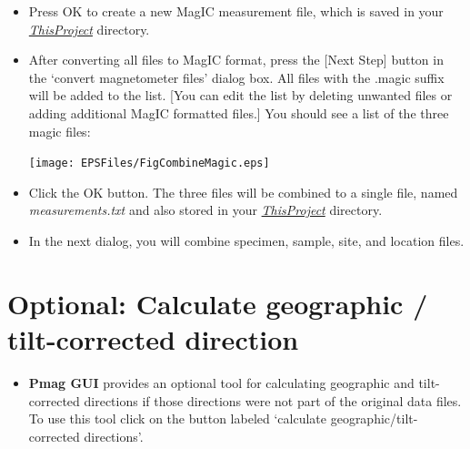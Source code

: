 \documentclass[11pt]{book}
\begin{document}
{\begin{itemize}
Your dialog boxes should look like this for the AF and thermal data:

\texttt{[image: EPSFiles/FigConvertGenericA.eps]}

and like this for the  paleointensity data.  For paleointensity data, you must also supply the lab field in micro tesla (40) and orientation relative to sample's X direction:  0 -90.

\texttt{[image: EPSFiles/FigConvertGenericB.eps]}

\item Press OK to create a new MagIC measurement file, which is saved in your \href{#Project_Directory}{\it ThisProject} directory.



\item After converting all files to MagIC format, press the [Next Step] button in the `convert magnetometer files' dialog box. All files with the .magic suffix will be added to the list.  [You can edit the list by deleting unwanted files or adding additional MagIC formatted files.]   You should see a list of the three magic files:

\texttt{[image: EPSFiles/FigCombineMagic.eps]}

\item Click the OK button. The three files will be combined to a single file,  named {\it measurements.txt} and also stored  in your \href{#Project_Directory}{\it ThisProject} directory.

\item In the next dialog, you will combine specimen, sample, site, and location files.
\end{itemize}


\section{Optional: Calculate geographic / tilt-corrected direction}
\begin{itemize}
\item {\bf Pmag GUI} provides an optional tool for calculating geographic and tilt-corrected directions if those directions were not part of the original data files. To use this tool click on the button labeled `calculate geographic/tilt-corrected directions'.


\end{itemize}}
\end{document}
